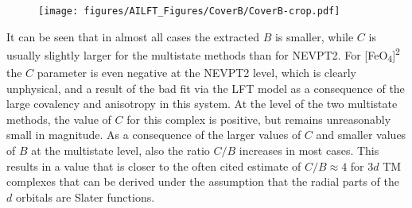  \begin{figure}
{\texttt{[image: figures/AILFT\_Figures/CoverB/CoverB-crop.pdf]}}
\end{figure}
It can be seen that in almost all cases the extracted $B$ is smaller, while $C$ is usually slightly larger for the multistate methods than for NEVPT2. For [FeO\textsubscript{4}]\textsuperscript{2\textminus} the $C$ parameter is even negative at the NEVPT2 level, which is clearly unphysical, and a result of the bad fit via the LFT model as a consequence of the large covalency and anisotropy in this system. At the level of the two multistate methods, the value of $C$ for this complex is positive, but remains unreasonably small in magnitude. As a consequence of the larger values of $C$ and smaller values of $B$ at the multistate level, also the ratio $C/B$ increases in most cases. This results in a value that is closer to the often cited estimate of $C/B \approx 4$ for $3d$ TM complexes that can be derived under the assumption that the radial parts of the $d$ orbitals are Slater functions.\cite{SinghEAN_2017_2}


